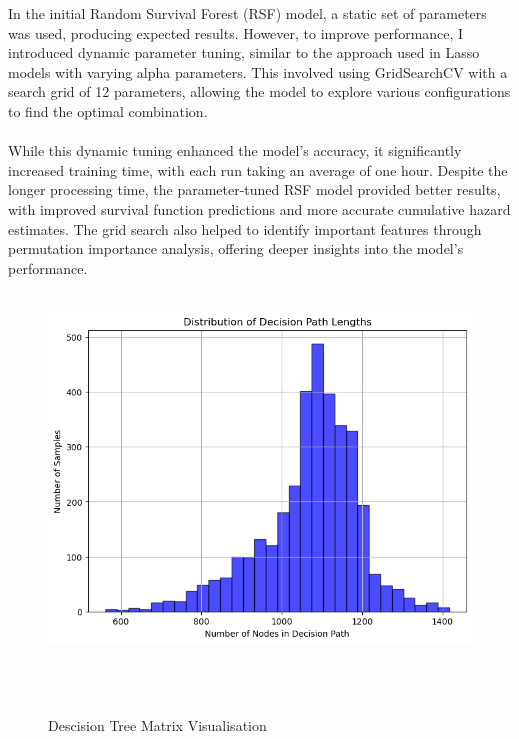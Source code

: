 In the initial Random Survival Forest (RSF) model, a static set of parameters was used, producing expected results. However, to improve performance, I introduced dynamic parameter tuning, similar to the approach used in Lasso models with varying alpha parameters. This involved using GridSearchCV with a search grid of 12 parameters, allowing the model to explore various configurations to find the optimal combination.
\\\\
\noindent While this dynamic tuning enhanced the model's accuracy, it significantly increased training time, with each run taking an average of one hour. Despite the longer processing time, the parameter-tuned RSF model provided better results, with improved survival function predictions and more accurate cumulative hazard estimates. The grid search also helped to identify important features through permutation importance analysis, offering deeper insights into the model's performance.
\begin{figure}[h]
    \centering
    \includegraphics[scale=0.41]{Figures/SURV/rsf_paths.png}
    \caption{Descision Tree Matrix Visualisation}
    \label{fig:des_path}
\end{figure}

\clearpage

